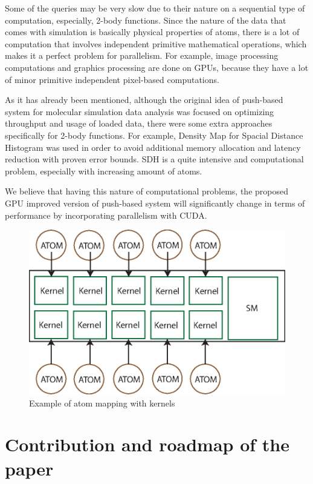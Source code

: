 \documentclass[12pt,letterpaper]{report}
\begin{document}
Some of the queries may be very slow due to their nature on a sequential type of computation,  especially, 2-body functions. Since the nature of the data that comes with simulation is basically physical properties of atoms, there is a lot of computation that involves independent primitive mathematical operations, which makes it a perfect problem for parallelism. For example, image processing computations and graphics processing are done on GPUs, because they have a lot of minor primitive independent pixel-based computations.

As it has already been mentioned, although the original idea of push-based system for molecular simulation data analysis was focused on optimizing throughput and usage of loaded data, there were some extra approaches specifically for 2-body functions. For example, Density Map for Spacial Distance Histogram was used in order to avoid additional memory allocation and latency reduction with proven error bounds. SDH is a quite intensive and computational problem, especially with increasing amount of atoms. 

We believe that having this nature of computational problems, the proposed GPU improved version of push-based system will significantly change in terms of performance by incorporating parallelism with CUDA.

\begin{figure}
\centering
\centerline{\includegraphics[width=0.5\columnwidth]{images/kernelatom.eps}}
\caption{ Example of atom mapping with kernels}
 \label{fg:kernelatom}


\end{figure}

\section{Contribution and roadmap of the paper} 
\end{document}
